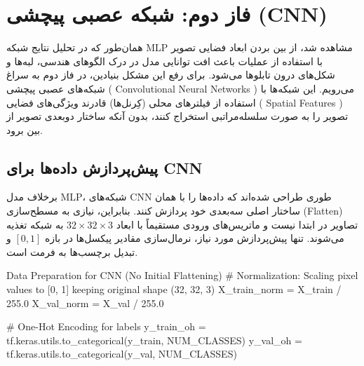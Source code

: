 \documentclass{article}
\begin{document}
\section{فاز دوم: شبکه عصبی پیچشی (CNN)}
همان‌طور که در تحلیل نتایج شبکه MLP مشاهده شد، از بین بردن ابعاد فضایی تصویر با استفاده از عملیات  باعث افت توانایی مدل در درک الگوهای هندسی، لبه‌ها و شکل‌های درون تابلوها می‌شود. برای رفع این مشکل بنیادین، در فاز دوم به سراغ شبکه‌های عصبی پیچشی ( Convolutional Neural Networks ) می‌رویم. این شبکه‌ها با استفاده از فیلترهای محلی (کِرنل‌ها) قادرند ویژگی‌های فضایی ( Spatial Features ) تصویر را به صورت سلسله‌مراتبی استخراج کنند، بدون آنکه ساختار دوبعدی تصویر از بین برود.

\subsection{پیش‌پردازش داده‌ها برای CNN}
برخلاف مدل MLP، شبکه‌های CNN طوری طراحی شده‌اند که داده‌ها را با همان ساختار اصلی سه‌بعدی خود پردازش کنند. بنابراین، نیازی به مسطح‌سازی (Flatten) تصاویر در ابتدا نیست و ماتریس‌های ورودی مستقیماً با ابعاد $32 \times 32 \times 3$ به شبکه تغذیه می‌شوند. تنها پیش‌پردازش مورد نیاز، نرمال‌سازی مقادیر پیکسل‌ها در بازه $[0, 1]$ و تبدیل برچسب‌ها به فرمت  است.

\begin{latin}
	\begin{vscodewindow}{Data Preparation for CNN (No Initial Flattening)}
# Normalization: Scaling pixel values to [0, 1] keeping original shape (32, 32, 3)
X_train_norm = X_train / 255.0
X_val_norm = X_val / 255.0

# One-Hot Encoding for labels
y_train_oh = tf.keras.utils.to_categorical(y_train, NUM_CLASSES)
y_val_oh = tf.keras.utils.to_categorical(y_val, NUM_CLASSES)
	\end{vscodewindow}
\end{latin}
\end{document}
